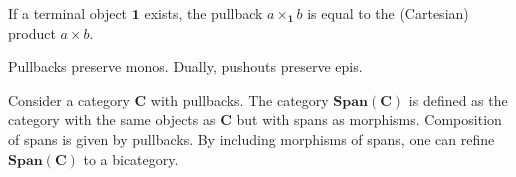     \begin{property}
        If a terminal object $\mathbf{1}$ exists, the pullback $a\times_{\mathbf{1}}b$ is equal to the (Cartesian) product $a\times b$.
    \end{property}

    \begin{property}
        Pullbacks preserve monos. Dually, pushouts preserve epis.
    \end{property}

    \begin{property}\label{cat:span_category}
        Consider a category $\mathbf{C}$ with pullbacks. The category $\mathbf{Span}(\mathbf{C})$ is defined as the category with the same objects as $\mathbf{C}$ but with spans as morphisms. Composition of spans is given by pullbacks. By including morphisms of spans, one can refine $\mathbf{Span}(\mathbf{C})$ to a bicategory.
    \end{property}

